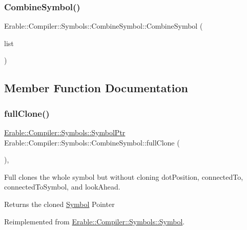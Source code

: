 \subsubsection{\texorpdfstring{CombineSymbol()}{CombineSymbol()}\hspace{0.1cm}{\footnotesize\ttfamily [2/2]}}
{\footnotesize\ttfamily Erable\+::\+Compiler\+::\+Symbols\+::\+Combine\+Symbol\+::\+Combine\+Symbol (\begin{DoxyParamCaption}\item[{\mbox{\hyperlink{namespace_erable_1_1_compiler_1_1_symbols_a63e8157d2f729d4689d27bacad42f8ed}{Symbol\+List}}}]{list }\end{DoxyParamCaption})}



\subsection{Member Function Documentation}
\mbox{\label{struct_erable_1_1_compiler_1_1_symbols_1_1_combine_symbol_ac20bc8743057e8668bb3871b24dd180d}} 
\subsubsection{\texorpdfstring{fullClone()}{fullClone()}}
{\footnotesize\ttfamily \mbox{\hyperlink{namespace_erable_1_1_compiler_1_1_symbols_a8f0bc762f448ea4d84e8713ab3e140b9}{Erable\+::\+Compiler\+::\+Symbols\+::\+Symbol\+Ptr}} Erable\+::\+Compiler\+::\+Symbols\+::\+Combine\+Symbol\+::full\+Clone (\begin{DoxyParamCaption}{ }\end{DoxyParamCaption})\hspace{0.3cm}{\ttfamily [override]}, {\ttfamily [virtual]}}

Full clones the whole symbol but without cloning dot\+Position, connected\+To, connected\+To\+Symbol, and look\+Ahead. \begin{DoxyReturn}{Returns}
the cloned \mbox{\hyperlink{class_erable_1_1_compiler_1_1_symbols_1_1_symbol}{Symbol}} Pointer 
\end{DoxyReturn}


Reimplemented from \mbox{\hyperlink{class_erable_1_1_compiler_1_1_symbols_1_1_symbol_a1d3750618449b2185abf49b891b3a61c}{Erable\+::\+Compiler\+::\+Symbols\+::\+Symbol}}.


